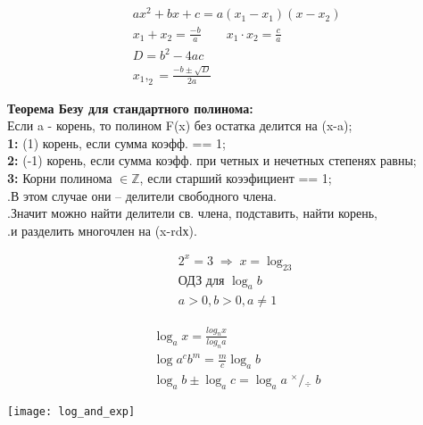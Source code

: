 \documentclass[10pt,a4paper]{scrartcl}
\begin{document}
	\begin{minipage}{0.3\linewidth}
		\begin{align*}
		& ax^2+bx+c = a(x_1 - x_1)(x-x_2) \\
		& x_1 + x_2 = \frac {-b}{a} \qquad x_1 \cdot x_2 = \frac {c}{a} \\[6pt]
		& D = b^2 -4ac \\
		& x_1,_2 = \frac{-b\pm\sqrt{D}}{2a}
		\end{align*}
	\end{minipage}
	\hfill
	\begin{minipage}{0.7\linewidth}

		\textbf{Теорема Безу для стандартного полинома:}\\
		Если a - корень, то полином F(x) без остатка делится на (x-a); \\
		\textbf{1: } (1) корень, если сумма коэфф. == 1; \\
		\textbf{2: } (-1) корень, если сумма коэфф. при четных и нечетных степенях равны; \\
		\textbf{3: } Корни полинома $\in\mathbb {Z}$, если старший коээфициент == 1; \\
					.\qquad В этом случае они -- делители свободного члена. \\
					.\qquad Значит можно найти делители св. члена, подставить, найти корень,\\
					.\qquad и разделить многочлен на (x-rdх).
	\end{minipage}

	\begin{minipage}{0.25\linewidth}\noindent 
		\begin{align*}
		& 2^x = 3 \; \Rightarrow \;x = \log_23 \\
		& \text{ОДЗ для }\log_ab \\
		& a>0, b>0, a \neq 1
		\end{align*}
	\end{minipage}
	\hfill
	\begin{minipage}{0.25\linewidth}\noindent 
	\begin{align*}
		& \log_ax = \frac{log_nx}{log_na} \\
		& \log{a^c}b^m = \frac{m}{c} \log_ab \\
		& \log_ab \pm \log_ac = \log_a{a \; ^{\times} \!\! / \!\! _{\div} \; b}
		\end{align*}
	\end{minipage}
	\begin{minipage}{0.5\linewidth}\noindent
		\texttt{[image: log\_and\_exp]}
	\end{minipage}
	
\end{document}
